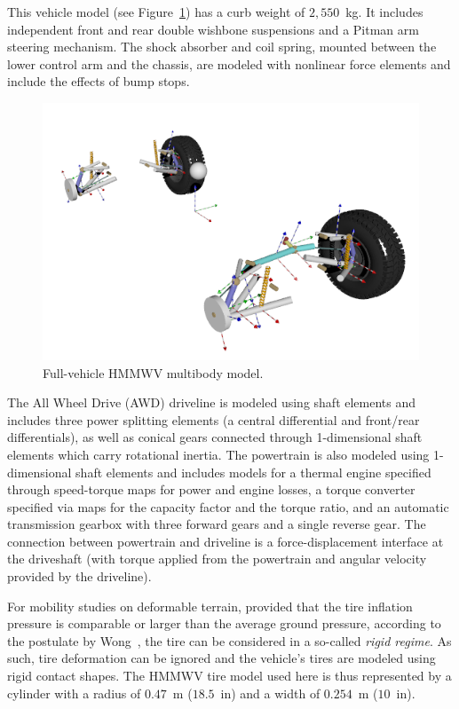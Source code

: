 \documentclass[12pt,onecolumn]{report}
\newcommand{\CHRONO}{{\sffamily{{Chrono}}}}
\begin{document}
This vehicle model (see Figure~\ref{fig:hmmwv}) has a curb weight of $2,550$~kg.
%
It includes independent front and rear double wishbone suspensions and a Pitman arm steering mechanism. The shock absorber and coil spring, mounted between the lower control arm and the chassis, are modeled with {\CHRONO} nonlinear force elements and include the effects of bump stops.
%
\begin{figure}
	\centering
	\includegraphics[width=\columnwidth]{Figs/hmmwv_bodies.png}
	\caption{\small Full-vehicle HMMWV multibody model.}  
	\label{fig:hmmwv}
\end{figure}

The All Wheel Drive (AWD) driveline is modeled using {\CHRONO} shaft elements and includes three power splitting elements (a central differential and front/rear differentials), as well as conical gears connected through 1-dimensional shaft elements which carry rotational inertia. 
%
The powertrain is also modeled using 1-dimensional shaft elements and includes models for a thermal engine specified through speed-torque maps for power and engine losses, a torque converter specified via maps for the capacity factor and the torque ratio, and an automatic transmission gearbox with three forward gears and a single reverse gear.
%
The connection between powertrain and driveline is a force-displacement interface at the driveshaft (with torque applied from the powertrain and angular velocity provided by the driveline).

For mobility studies on deformable terrain, provided that the tire inflation pressure is comparable or larger than the average ground pressure, according to the postulate by Wong~\cite{wong93}, the tire can be considered in a so-called {\em rigid regime}.  As such, tire deformation can be ignored and the vehicle's tires are modeled using rigid contact shapes.  The HMMWV tire model used here is thus represented by a cylinder with a radius of $0.47$~m ($18.5$~in) and a width of $0.254$~m ($10$~in).
\end{document}
